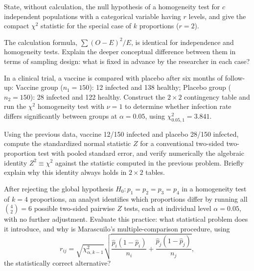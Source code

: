 \begin{problema}\label{prob:7ccb176}
State, without calculation, the null hypothesis of a homogeneity test for $c$ independent populations with a categorical variable having $r$ levels, and give the compact $\chi^2$ statistic for the special case of $k$ proportions ($r=2$).
\end{problema}

\begin{problema}\label{prob:44ef899}
The calculation formula, $\sum(O-E)^2/E$, is identical for independence and homogeneity tests. Explain the deeper conceptual difference between them in terms of sampling design: what is fixed in advance by the researcher in each case?
\end{problema}

\begin{problema}\label{prob:3a99a23}
In a clinical trial, a vaccine is compared with placebo after six months of follow-up: Vaccine group ($n_1=150$): 12 infected and 138 healthy; Placebo group ($n_2=150$): 28 infected and 122 healthy. Construct the $2\times2$ contingency table and run the $\chi^2$ homogeneity test with $\nu=1$ to determine whether infection rate differs significantly between groups at $\alpha=0.05$, using $\chi^2_{0.05,1}=3.841$.
\end{problema}

\begin{problema}\label{prob:a98f897}
Using the previous data, vaccine 12/150 infected and placebo 28/150 infected, compute the standardized normal statistic $Z$ for a conventional two-sided two-proportion test with pooled standard error, and verify numerically the algebraic identity $Z^2\equiv\chi^2$ against the statistic computed in the previous problem. Briefly explain why this identity always holds in $2\times2$ tables.
\end{problema}

\begin{problema}\label{prob:cb7e8b6}
After rejecting the global hypothesis $H_0:p_1=p_2=p_3=p_4$ in a homogeneity test of $k=4$ proportions, an analyst identifies which proportions differ by running all $\binom42=6$ possible two-sided pairwise $Z$ tests, each at individual level $\alpha=0.05$, with no further adjustment. Evaluate this practice: what statistical problem does it introduce, and why is Marascuilo's multiple-comparison procedure, using
\[
	r_{ij}=\sqrt{\chi^2_{\alpha,k-1}}\sqrt{\frac{\hat p_i(1-\hat p_i)}{n_i}+\frac{\hat p_j(1-\hat p_j)}{n_j}},
\]
the statistically correct alternative?
\end{problema}

